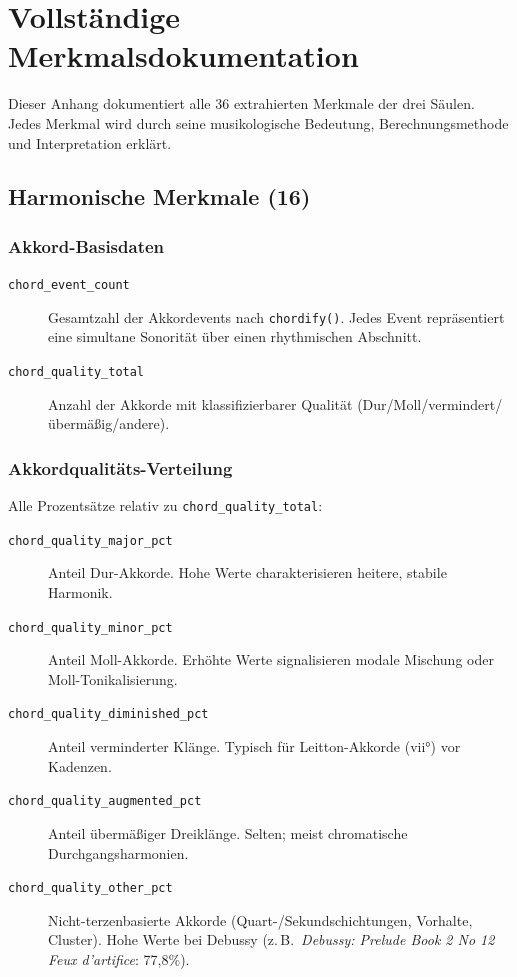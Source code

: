 \documentclass[10pt,a4paper]{article}
\theoremstyle{definition}
\begin{document}
\newpage
{}
\hypersetup{pageanchor=true}
\setcounter{page}{1}
\appendix
\section{Vollständige Merkmalsdokumentation}\label{app:A}

Dieser Anhang dokumentiert alle 36 extrahierten Merkmale der drei Säulen. Jedes Merkmal wird durch seine musikologische Bedeutung, Berechnungsmethode und Interpretation erklärt.

\subsection{Harmonische Merkmale (16)}

\subsubsection*{Akkord-Basisdaten}
\begin{description}
    \item[\texttt{chord\_event\_count}] Gesamtzahl der Akkordevents nach \texttt{chordify()}. Jedes Event repräsentiert eine simultane Sonorität über einen rhythmischen Abschnitt.
    
    \item[\texttt{chord\_quality\_total}] Anzahl der Akkorde mit klassifizierbarer Qualität (Dur/Moll/vermindert/übermäßig/andere).
\end{description}

\subsubsection*{Akkordqualitäts-Verteilung}
Alle Prozentsätze relativ zu \texttt{chord\_quality\_total}:
\begin{description}
    \item[\texttt{chord\_quality\_major\_pct}] Anteil Dur-Akkorde. Hohe Werte charakterisieren heitere, stabile Harmonik.
    
    \item[\texttt{chord\_quality\_minor\_pct}] Anteil Moll-Akkorde. Erhöhte Werte signalisieren modale Mischung oder Moll-Tonikalisierung.
    
    \item[\texttt{chord\_quality\_diminished\_pct}] Anteil verminderter Klänge. Typisch für Leitton-Akkorde (vii°) vor Kadenzen.
    
    \item[\texttt{chord\_quality\_augmented\_pct}] Anteil übermäßiger Dreiklänge. Selten; meist chromatische Durchgangsharmonien.
    
    \item[\texttt{chord\_quality\_other\_pct}] Nicht-terzenbasierte Akkorde (Quart-/Sekundschichtungen, Vorhalte, Cluster). Hohe Werte bei Debussy (z.\,B.\ \emph{Debussy: Prelude Book 2 No 12 Feux d'artifice}: 77{,}8\%).
\end{description}
\end{document}
